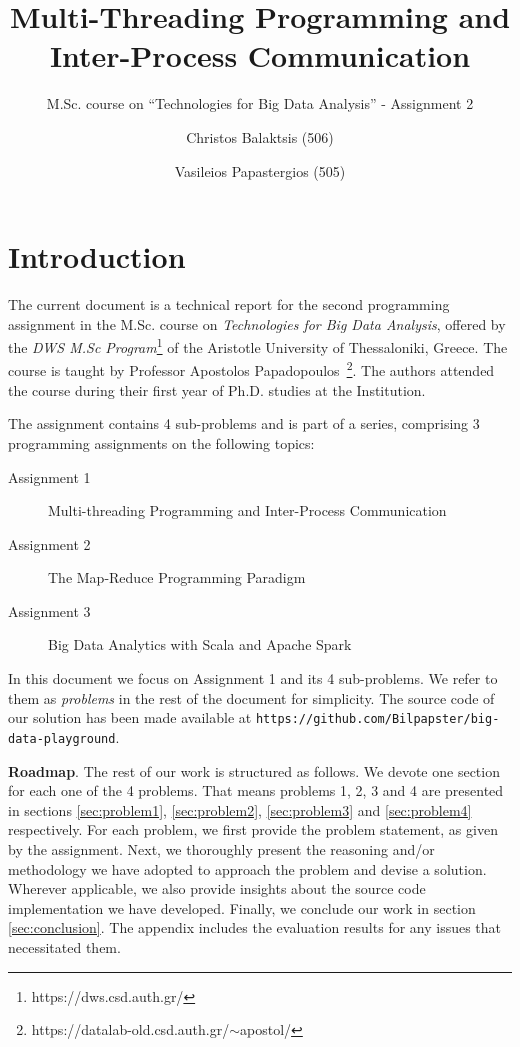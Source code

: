 \documentclass[acmlarge]{acmart}
\begin{document}
\title{Multi-Threading Programming and Inter-Process Communication}
\subtitle{M.Sc. course on ``Technologies for Big Data Analysis'' - Assignment 2}

\author{Christos Balaktsis (506)}
\author{Vasileios Papastergios (505)}

\renewcommand{\shortauthors}{C. Balaktsis and V. Papastergios}
\maketitle

\section{Introduction}

The current document is a technical report for the second programming assignment in the M.Sc. course on
\emph{Technologies for Big Data Analysis}, offered by the \emph{DWS M.Sc Program}\footnote{https://dws.csd.auth.gr/} of the Aristotle University of Thessaloniki, Greece. The course is taught by Professor Apostolos Papadopoulos~\footnote{https://datalab-old.csd.auth.gr/$\sim$apostol/}. The authors attended the course during their first year of Ph.D. studies at the Institution.

The assignment contains 4 sub-problems and is part of a series, comprising 3 programming assignments on the following topics:
\begin{description}
  \item[Assignment 1] Multi-threading Programming and Inter-Process Communication
  \item[Assignment 2] The Map-Reduce Programming Paradigm
  \item[Assignment 3] Big Data Analytics with Scala and Apache Spark
\end{description}
In this document we focus on Assignment 1 and its 4 sub-problems.
We refer to them as \emph{problems} in the rest of the document for simplicity.
The source code of our solution has been made available at \texttt{\small https://github.com/Bilpapster/big-data-playground}.

\textbf{Roadmap}.
The rest of our work is structured as follows.
We devote one section for each one of the 4 problems.
That means problems 1, 2, 3 and 4 are presented in sections \ref{sec:problem1}, \ref{sec:problem2}, \ref{sec:problem3} and \ref{sec:problem4} respectively.
For each problem, we first provide the problem statement, as given by the assignment.
Next, we thoroughly present the reasoning and/or methodology we have adopted to approach the problem and devise a solution.
Wherever applicable, we also provide insights about the source code implementation we have developed.
Finally, we conclude our work in section \ref{sec:conclusion}.
The appendix includes the evaluation results for any issues that necessitated them.
\end{document}
